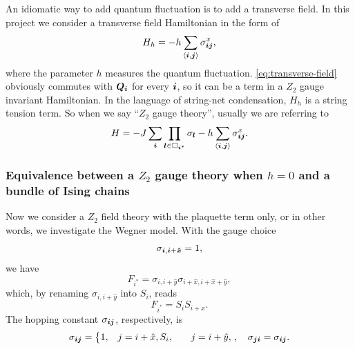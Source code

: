 \documentclass[hyperref, a4paper]{article}
\newcommand*{\pair}[1]{\langle #1 \rangle}
\newcommand*{\Ztwo}{\texorpdfstring{$\mathbb{Z}_2$ }{Z2 }}
\def\\{}%
\def\mathbb#1{#1}%
\begin{document}
An idiomatic way to add quantum fluctuation is to add a transverse field.
In this project we consider a transverse field Hamiltonian in the form of 
\begin{equation}
    H_h = - h \sum_{\pair{\vb*{i}, \vb*{j}}} \sigma_{\vb*{i} \vb*{j}}^x ,
    \label{eq:transverse-field}
\end{equation}
where the parameter $h$ measures the quantum fluctuation.
\eqref{eq:transverse-field} obviously commutes with $\vb*{Q}_{\vb*{i}}$ for every $\vb*{i}$, so it can be a term in a \Ztwo gauge invariant Hamiltonian. 
In the language of string-net condensation, $H_h$ is a string tension term.
So when we say ``\Ztwo gauge theory'', usually we are referring to 
\begin{equation}
    H = - J \sum_{\vb*{i}} \prod_{\vb*{l} \in \Box_{\vb*{i}^*}} \sigma_{\vb*{l}} - h \sum_{\pair{\vb*{i}, \vb*{j}}} \sigma_{\vb*{i} \vb*{j}}^x.
    \label{eq:standard-z2-theory}
\end{equation}

\subsubsection{Equivalence between a \Ztwo gauge theory when $h = 0$ and a bundle of Ising chains}

Now we consider a \Ztwo field theory with the plaquette term only, or in other words, we investigate the Wegner model.
With the gauge choice
\begin{equation}
    \sigma_{\vb*{i}, \vb*{i}+\vu*{x}} = 1,
    \label{eq:gauge-choice-x}
\end{equation}
we have
\begin{equation}
    F_{i^*} = \sigma_{i, i+\hat{y}} \sigma_{i+\hat{x}, i + \hat{x} + \hat{y}},
\end{equation}
which, by renaming $\sigma_{i, i+\hat{y}}$ into $S_i$, reads 
\begin{equation}
    F_{i^*} = S_i S_{i+\hat{x}}.
\end{equation}
The hopping constant $\sigma_{\vb*{i} \vb*{j}}$, respectively, is
\begin{equation}
    \sigma_{\vb*{i} \vb*{j}} = \left\{
    \begin{aligned}
        1, &\quad j = i + \hat{x}, \\
        S_i, &\quad j = i + \hat{y},
    \end{aligned}
\right., \quad \sigma_{\vb*{j} \vb*{i}} = \sigma_{\vb*{i} \vb*{j}}.
\end{equation}
\end{document}
